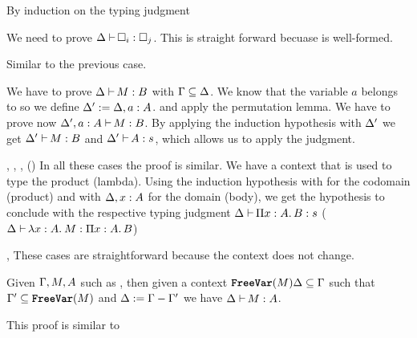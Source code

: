 \begin{Proof}
By induction on the typing judgment 
\begin{SubProofCase}{\CicType}
We need to prove $\ctyping[][\varContext]{\Type}{\Type[j]}$. 
This is straight forward becuase \varContext{} is well-formed.
\end{SubProofCase}

\begin{SubProofCase}{\CicProp}
Similar to the previous case.
\end{SubProofCase}

\begin{SubProofCase}{\CicWeak}
We have to prove $\ctyping[][\varContext]{M}{B}$ with $\Gamma \subseteq \Delta$. We know
that the variable $a$ belongs to \varContext{} so we define
$\Delta':=\Delta,a:A$.
and apply the permutation lemma. We have to prove now 
$\ctyping[\typing{a}{A}][\varContext']{M}{B}$. By applying the induction hypothesis with 
$\Delta'$ we get $\ctyping[][\varContext']{M}{B}$ and $\ctyping[][\varContext']{A}{s}$,
which allows us to apply the \CicWeak{} judgment.
\end{SubProofCase}

\begin{SubProofCase}{\CicTypeProd, \CicPropProd, \CicImpred, (\CicAbs)}
In all these cases the proof is similar. We have a context \varContext{} that is used to 
type the product (lambda).
Using the induction hypothesis with \varContext{} for the codomain (product) and with 
$\Delta,x:A$ for the domain (body),
we get the hypothesis to conclude with the respective 
typing judgment $\ctyping[][\varContext]{\depArrow{x}{A}{B}}{s}$ 
($\ctyping[][\varContext]{\abs{x}{A}{M}}{\depArrow{x}{A}{B}}$)
\end{SubProofCase}

\begin{SubProofCase}{\CicConv, \CicApp}
These cases are straightforward because the context does not change.
\end{SubProofCase}
\end{Proof}

\begin{Lemma}
\label{lemma:ContextWeakening}
Given $\Gamma,M,A$ such as , then given a 
context $\texttt{\textbf{FreeVar}}(M)\Delta\subseteq\Gamma$ such that
$\Gamma' \subseteq\texttt{\textbf{FreeVar}}(M)$ and $\Delta:=\Gamma-\Gamma'$ we have 
$\ctyping[][\varContext]{M}{A}$.
\end{Lemma}
\begin{Proof}
This proof is similar to 
\end{Proof}

